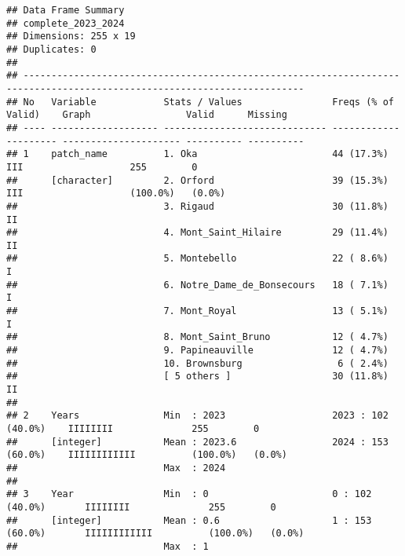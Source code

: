 \documentclass[
]{article}
\begin{document}
\begin{verbatim}
## Data Frame Summary  
## complete_2023_2024  
## Dimensions: 255 x 19  
## Duplicates: 0  
## 
## ------------------------------------------------------------------------------------------------------------------------
## No   Variable            Stats / Values                Freqs (% of Valid)    Graph                 Valid      Missing   
## ---- ------------------- ----------------------------- --------------------- --------------------- ---------- ----------
## 1    patch_name          1. Oka                        44 (17.3%)            III                   255        0         
##      [character]         2. Orford                     39 (15.3%)            III                   (100.0%)   (0.0%)    
##                          3. Rigaud                     30 (11.8%)            II                                         
##                          4. Mont_Saint_Hilaire         29 (11.4%)            II                                         
##                          5. Montebello                 22 ( 8.6%)            I                                          
##                          6. Notre_Dame_de_Bonsecours   18 ( 7.1%)            I                                          
##                          7. Mont_Royal                 13 ( 5.1%)            I                                          
##                          8. Mont_Saint_Bruno           12 ( 4.7%)                                                       
##                          9. Papineauville              12 ( 4.7%)                                                       
##                          10. Brownsburg                 6 ( 2.4%)                                                       
##                          [ 5 others ]                  30 (11.8%)            II                                         
## 
## 2    Years               Min  : 2023                   2023 : 102 (40.0%)    IIIIIIII              255        0         
##      [integer]           Mean : 2023.6                 2024 : 153 (60.0%)    IIIIIIIIIIII          (100.0%)   (0.0%)    
##                          Max  : 2024                                                                                    
## 
## 3    Year                Min  : 0                      0 : 102 (40.0%)       IIIIIIII              255        0         
##      [integer]           Mean : 0.6                    1 : 153 (60.0%)       IIIIIIIIIIII          (100.0%)   (0.0%)    
##                          Max  : 1                                                                                       

\end{verbatim}
\end{document}
